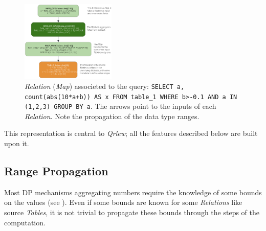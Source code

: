 \documentclass[letterpaper]{article} %
\newcommand{\qrlew}{\emph{Qrlew}}
\begin{document}
\begin{figure}[t]
    \centering
    \includegraphics[width=0.4\textwidth]{figures/relation}
    \caption{\emph{Relation} (\emph{Map}) associeted to the query: \texttt{SELECT a, count(abs(10*a+b)) AS x FROM table\_1 WHERE b>-0.1 AND a IN (1,2,3) GROUP BY a}. The arrows point to the inputs of each \emph{Relation}. Note the propagation of the data type ranges.}
    \label{process}
\end{figure}

This representation is central to \qrlew{}; all the features described below are built upon it.

\subsection{Range Propagation}

Most DP mechanisms aggregating numbers require the knowledge of some bounds on the values (see \cite{dwork2014algorithmic}).
Even if some bounds are known for some \emph{Relations} like source \emph{Tables}, it is not trivial to propagate these bounds through the steps of the computation.
\end{document}
